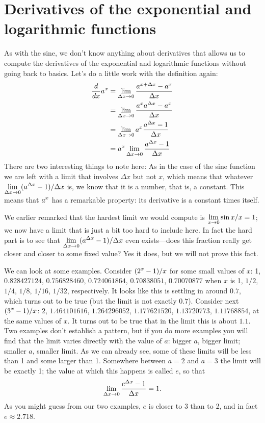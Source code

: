 \section{Derivatives of the exponential and logarithmic functions}

As with the sine, we don't know anything about derivatives that allows
us to compute the derivatives of the exponential and logarithmic
functions without going back to basics. Let's do a little work with
the definition again:
\begin{align*}
{d\over dx}a^x&=\lim_{\Delta x\to 0} {a^{x+\Delta x}-a^x\over \Delta x} \\
&=\lim_{\Delta x\to 0} {a^xa^{\Delta x}-a^x\over \Delta x} \\
&=\lim_{\Delta x\to 0} a^x{a^{\Delta x}-1\over \Delta x} \\
&=a^x\lim_{\Delta x\to 0} {a^{\Delta x}-1\over \Delta x} \\
\end{align*}
There are two interesting things to note here: As in the case of the
sine function we are left with a limit that involves $\Delta x$ but
not $x$, which means that whatever $\displaystyle \lim_{\Delta x\to 0} (a^{\Delta
    x}-1)/\Delta x$ is, we know that it is a number, that is, a
constant. This means that $\displaystyle a^x$ has a remarkable property: its
derivative is a constant times itself.

We earlier remarked that the hardest limit we would compute is
$\displaystyle \lim_{x\to0}\sin x/x=1$; we now have a limit that is just a bit too
hard to include here. In fact the hard part is to see that
$\displaystyle \lim_{\Delta x\to 0} (a^{\Delta
    x}-1)/\Delta x$ even exists---does this fraction really get closer
and closer to some fixed value? Yes it does, but we will not prove
this fact.

We can look at some examples. Consider $\displaystyle (2^x-1)/x$ for some small
values of $x$: 1, $0.828427124$, $0.756828460$, $0.724061864$,
$0.70838051$, $0.70070877$ when $x$ is 1, $1/2$, $1/4$, $1/8$, $1/16$,
$1/32$, respectively. It looks like this is settling in around $0.7$,
which turns out to be true (but the limit is not exactly $0.7$).
Consider next $\displaystyle (3^x-1)/x$: $2$,  $1.464101616$,
$1.264296052$, $1.177621520$, $1.13720773$, $1.11768854$, at the same
values of $x$. It turns out to be true that in the limit this
is about $1.1$. Two examples don't establish a pattern, but if you do
more examples you will find that the limit varies directly with the
value of $a$: bigger $a$, bigger limit; smaller $a$, smaller limit. As
we can already see, some of these limits will be less than 1 and some
larger than 1. Somewhere between $a=2$ and $a=3$ the limit will be
exactly 1; the value at which this happens is called $e$, so that
$$\lim_{\Delta x\to 0} {e^{\Delta x}-1\over \Delta x}=1.$$ As you
might guess from our two examples, $e$ is closer to 3 than to 2, and
in fact $e\approx 2.718$.


